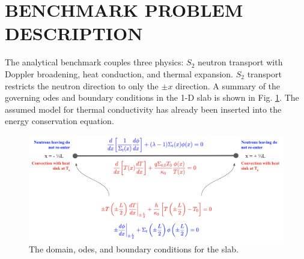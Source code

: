 \documentclass[letterpaper]{mc2023}
\begin{document}
\section{BENCHMARK PROBLEM DESCRIPTION}
\label{sec:benchmark}
The analytical benchmark couples three physics: $S_2$ neutron transport with Doppler broadening, heat conduction, and thermal
expansion. $S_{2}$ transport restricts the neutron direction to only the $\pm x$ direction. A summary of the governing \glspl{ode}
and boundary conditions in the 1-D slab is shown in Fig. \ref{fig:slab_diagram}. The assumed model for thermal conductivity has
already been inserted into the energy conservation equation.
\begin{figure}[H]
    \centering
    \includegraphics[width=0.85\linewidth]{figures/1D_Benchmark_Diagram.png}
    \caption{The domain, \glspl{ode}, and boundary conditions for the slab.}
    \label{fig:slab_diagram}
\end{figure}
\end{document}
